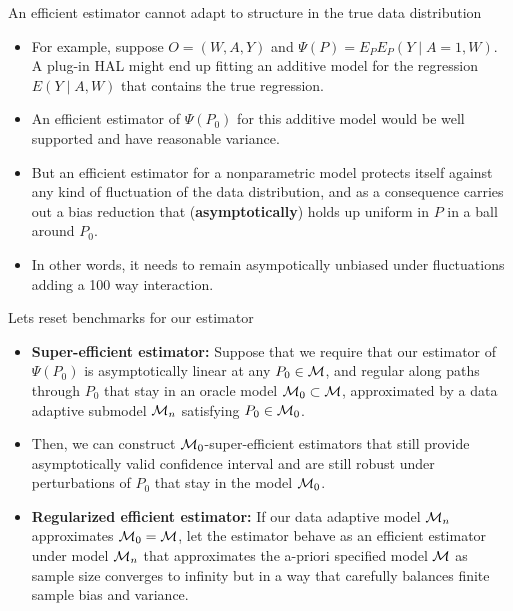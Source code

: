 \documentclass[t]{beamer}
\begin{document}
\begin{frame}{An efficient estimator cannot adapt to structure in the true data distribution}
\begin{itemize}
\item For example, suppose $O=(W,A,Y)$ and $\Psi(P)=E_PE_P(Y\mid A=1,W)$. A plug-in HAL might end up fitting an additive model for the regression $E(Y\mid A,W)$ that contains the true regression.
\item An efficient estimator of $\Psi(P_0)$ for this additive model would be well supported and have reasonable variance.
\item But an efficient estimator for a nonparametric model protects itself against any kind of fluctuation of the data distribution, and as a consequence carries out a bias reduction that ({\bf asymptotically}) holds up uniform in $P$ in a ball around $P_0$.
\item In other words, it needs to remain asympotically unbiased under fluctuations adding a 100 way interaction.
\end{itemize}
\end{frame}

\begin{frame}{Lets reset benchmarks for our estimator}
\begin{itemize}
\item {\bf Super-efficient estimator:}
Suppose that we require that our estimator of $\Psi(P_0)$ is asymptotically linear at any $P_0\in {\cal M}$, and regular along paths through $P_0$ that stay in an oracle model ${\cal M}_0\subset {\cal M}$, approximated by a data adaptive submodel ${\cal M}_n$ satisfying $P_0\in {\cal M}_0$.
\item Then, we can construct ${\cal M}_0$-super-efficient estimators that still provide asymptotically valid confidence interval and are still robust under perturbations of $P_0$ that stay in the model ${\cal M}_0$.
\item {\bf Regularized efficient estimator:} If our data adaptive model ${\cal M}_n$ approximates ${\cal M}_0={\cal M}$, let the estimator behave as an efficient estimator under model ${\cal M}_n$ that approximates the a-priori specified model ${\cal M}$ as sample size converges to infinity but in a way that carefully balances finite sample bias and variance.
\end{itemize}
\end{frame}
\end{document}
